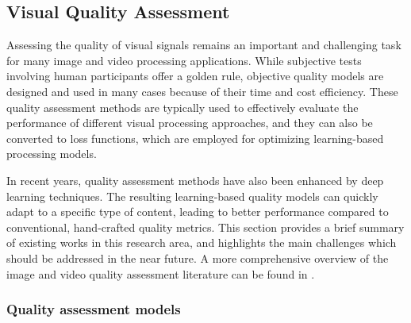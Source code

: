 \documentclass[11pt,a4paper]{article}
\begin{document}
\subsection{Visual Quality Assessment}
\label{ssec:asssessment}

Assessing the quality of visual signals remains an important and challenging task for many image and video processing applications. While subjective tests involving human participants offer a golden rule, objective quality models are designed and used in many cases because of their time and cost efficiency. These quality assessment methods are typically used to effectively evaluate the performance of different visual processing approaches, and they can also be converted to loss functions, which are employed for optimizing learning-based processing models.  

In recent years, quality assessment methods have also been enhanced by deep learning techniques. The resulting learning-based quality models can quickly adapt to a specific type of content, leading to better performance compared to conventional, hand-crafted quality metrics. This section provides a brief summary of existing works in this research area, and highlights the main challenges which should be addressed in the near future. A more comprehensive overview of the image and video quality assessment literature can be found in \cite{zhai2020perceptual,zheng2024video,zhang2024quality}.

\subsubsection{Quality assessment models}
\end{document}
